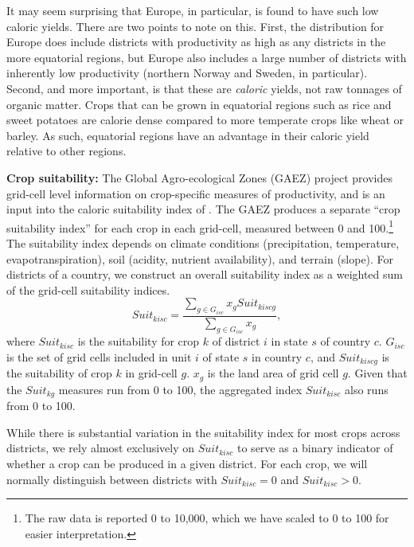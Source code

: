 \documentclass[11pt]{article}
\begin{document}
It may seem surprising that Europe, in particular, is found to have such low caloric yields. There are two points to note on this. First, the distribution for Europe does include districts with productivity as high as any districts in the more equatorial regions, but Europe also includes a large number of districts with inherently low productivity (northern Norway and Sweden, in particular). Second, and more important, is that these are \textit{caloric} yields, not raw tonnages of organic matter. Crops that can be grown in equatorial regions such as rice and sweet potatoes are calorie dense compared to more temperate crops like wheat or barley. As such, equatorial regions have an advantage in their caloric yield relative to other regions. 

\vspace{.5cm}\noindent\textbf{Crop suitability:} The Global Agro-ecological Zones (GAEZ) project \citep{gaez} provides grid-cell level information on crop-specific measures of productivity, and is an input into the caloric suitability index of \citet{galorozak2016}. The GAEZ produces a separate ``crop suitability index'' for each crop in each grid-cell, measured between 0 and 100.\footnote{The raw data is reported 0 to 10,000, which we have scaled to 0 to 100 for easier interpretation.} The suitability index depends on climate conditions (precipitation, temperature, evapotranspiration), soil (acidity, nutrient availability), and terrain (slope). For districts of a country, we construct an overall suitability index as a weighted sum of the grid-cell suitability indices.
\begin{equation}
	Suit_{kisc} = \frac{\sum_{g \in G_{isc}} x_g Suit_{kiscg}}{\sum_{g \in G_{isc}} x_g},
\end{equation}
where $Suit_{kisc}$ is the suitability for crop $k$ of district $i$ in state $s$ of country $c$. $G_{isc}$ is the set of grid cells included in unit $i$ of state $s$ in country $c$, and $Suit_{kiscg}$ is the suitability of crop $k$ in grid-cell $g$. $x_g$ is the land area of grid cell $g$. Given that the $Suit_{kg}$ measures run from 0 to 100, the aggregated index $Suit_{kisc}$ also runs from 0 to 100.

While there is substantial variation in the suitability index for most crops across districts, we rely almost exclusively on $Suit_{kisc}$ to serve as a binary indicator of whether a crop can be produced in a given district. For each crop, we will normally distinguish between districts with $Suit_{kisc}=0$ and $Suit_{kisc}>0$. 
\end{document}
